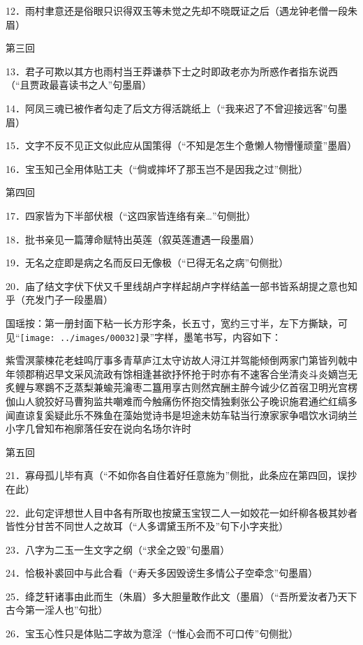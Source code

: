12．雨村聿意还是俗眼只识得双玉等未觉之先却不晓既证之后{（\kaishu 遇龙钟老僧一段朱眉）}

第三回

13．君子可欺以其方也雨村当王莽谦恭下士之时即政老亦为所惑作者指东说西{（\kaishu ``且贾政最喜读书之人''句墨眉）}

14．阿凤三魂已被作者勾走了后文方得活跳纸上{（\kaishu ``我来迟了不曾迎接远客''句墨眉）}

15．文字不反不见正文似此应从国策得{（\kaishu ``不知是怎生个惫懒人物懵懂顽童''墨眉）}

16．宝玉知己全用体贴工夫{（\kaishu ``倘或摔坏了那玉岂不是因我之过''侧批）}

第四回

17．四家皆为下半部伏根{（\kaishu ``这四家皆连络有亲\ldots{}''句侧批）}

18．批书亲见一篇薄命赋特出英莲{（\kaishu 叙英莲遭遇一段墨眉）}

19．无名之症即是病之名而反曰无像极{（\kaishu ``已得无名之病''句侧批）}

20．庙了结文字伏下伏又千里线胡卢字样起胡卢字样结盖一部书皆系胡提之意也知乎{（\kaishu 充发门子一段墨眉）}

国瑶按：第一册封面下粘一长方形字条，长五寸，宽约三寸半，左下方撕缺，可见``\texttt{[image: ../images/00032]}录''字样，墨笔书写，内容如下：

紫雪溟蒙楝花老蛙鸣厅事多青草庐江太守访故人浔江并驾能倾倒两家门第皆列戟中年领郡稍迟早文采风流政有馀相逢甚欲抒怀抢于时亦有不速客合坐清炎斗炎嫡岂无炙鲤与寒鷃不乏蒸梨兼蝓芫瀹枣二簋用享古则然宾酬主醉今诚少亿首宿卫明光宫楞伽山人貌狡好马曹狗监共嘲难而今触痛伤怀抱交情独剩张公子晚识施君通纻红缟多闻直谅复奚疑此乐不殊鱼在藻始觉诗书是坦途未妨车轱当行潦家家争唱饮水词纳兰小字几曾知布袍廓落任安在说向名场尔许时

第五回

21．寡母孤儿毕有真{（\kaishu ``不如你各自住着好任意施为''侧批，此条应在第四回，误抄在此）}

22．此句定评想世人目中各有所取也按黛玉宝钗二人一如姣花一如纤柳各极其妙者皆性分甘苦不同世人之故耳{（\kaishu ``人多谓黛玉所不及''句下小字夹批）}

23．八字为二玉一生文字之纲{（\kaishu ``求全之毁''句墨眉）}

24．恰极补裘回中与此合看{（\kaishu ``寿夭多因毁谤生多情公子空牵念''句墨眉）}

25．绛芝轩诸事由此而生{（\kaishu 朱眉）}多大胆量敢作此文{（\kaishu 墨眉）（``吾所爱汝者乃天下古今第一淫人也''句批）}

26．宝玉心性只是体贴二字故为意淫{（\kaishu ``惟心会而不可口传''句侧批）}

